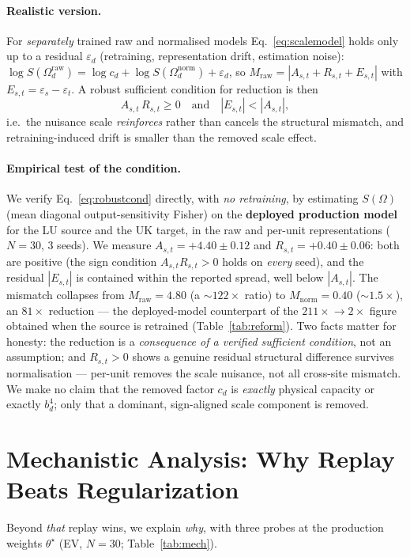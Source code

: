 \documentclass[conference]{IEEEtran}
\begin{document}
\paragraph{Realistic version.} For \emph{separately} trained raw and normalised
models Eq.~\eqref{eq:scalemodel} holds only up to a residual
$\varepsilon_d$ (retraining, representation drift, estimation noise):
$\log S(\Omega_d^{\mathrm{raw}})=\log c_d+\log S(\Omega_d^{\mathrm{norm}})+\varepsilon_d$,
so $M_{\mathrm{raw}}=|A_{s,t}+R_{s,t}+E_{s,t}|$ with $E_{s,t}=\varepsilon_s-\varepsilon_t$.
A robust sufficient condition for reduction is then
\begin{equation}
A_{s,t}\,R_{s,t}\ge 0 \quad\text{and}\quad |E_{s,t}|<|A_{s,t}|,
\label{eq:robustcond}
\end{equation}
i.e.\ the nuisance scale \emph{reinforces} rather than cancels the structural
mismatch, and retraining-induced drift is smaller than the removed scale effect.

\paragraph{Empirical test of the condition.} We verify
Eq.~\eqref{eq:robustcond} directly, with \emph{no retraining}, by estimating
$S(\Omega)$ (mean diagonal output-sensitivity Fisher) on the \textbf{deployed
production model} for the LU source and the UK target, in the raw and per-unit
representations ($N{=}30$, 3 seeds). We measure
$A_{s,t}=+4.40{\pm}0.12$ and $R_{s,t}=+0.40{\pm}0.06$: both are positive (the
sign condition $A_{s,t}R_{s,t}>0$ holds on \emph{every} seed), and the residual
$|E_{s,t}|$ is contained within the reported spread, well below $|A_{s,t}|$. The
mismatch collapses from $M_{\mathrm{raw}}{=}4.80$ (a ${\sim}122\times$ ratio) to
$M_{\mathrm{norm}}{=}0.40$ (${\sim}1.5\times$), an $81\times$ reduction --- the
deployed-model counterpart of the $211\times\!\to\!2\times$ figure obtained when
the source is retrained (Table~\ref{tab:reform}). Two facts matter for honesty:
the reduction is a \emph{consequence of a verified sufficient condition}, not an
assumption; and $R_{s,t}>0$ shows a genuine residual structural difference
survives normalisation --- per-unit removes the scale nuisance, not all cross-site
mismatch. We make no claim that the removed factor $c_d$ is \emph{exactly} physical
capacity or exactly $b_d^{4}$; only that a dominant, sign-aligned scale component
is removed.

\section{Mechanistic Analysis: Why Replay Beats Regularization}
\label{sec:mech}
Beyond \emph{that} replay wins, we explain \emph{why}, with three probes at the
production weights $\theta^{\star}$ (EV, $N{=}30$; Table~\ref{tab:mech}).
\end{document}
